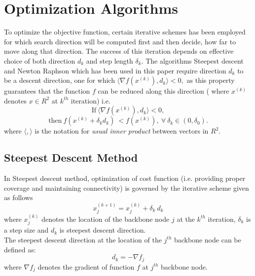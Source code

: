\documentclass[11pt]{article}
\numberwithin{equation}{section}
\begin{document}
\section{Optimization Algorithms}




To optimize the objective function, certain iterative schemes has been employed for which search direction will be computed first and then decide, how far to move along that direction. The success of this iteration depends on effective choice of both direction $d_k$ and step length $\delta_k.$
 The algorithms Steepest descent and Newton Raphson which has been used in this paper require direction $d_k$ to be a descent direction, one for which $\langle \nabla f(x^{(k)}),d_k \rangle <0,$ as this property guarantees that the function $f$ can be reduced along this direction ( where ${x^{(k)}}$ denotes $x \in {R^{2}}$ at $k^{th}$ iteration) i.e.
 \begin{equation*}
  \text{If}~ \langle \nabla f(x^{(k)}),d_k \rangle <0,
 \end{equation*}
 \begin{equation*}
  \text{then}~ f(x^{(k)}+\delta_k d_k)~< f(x^{(k)}),~ \forall~ \delta_k \in(0, \delta_0).
 \end{equation*}
 where $\langle , \rangle $ is the notation for {\it usual inner product} between vectors in $R^2.$





\subsection{Steepest Descent Method}
In Steepest descent method, optimization of cost function (i.e. providing proper coverage and maintaining connectivity) is governed by the iterative scheme given as follows
\begin{equation}\label{e28}
 x_{j}^{(k+1)}=x_{j}^{(k)}+\delta_k~d_{k}
\end{equation}
where $x_{j}^{(k)}$   denotes the location of the backbone node $j$ at the $k^{th}$ iteration,  $\delta_k$ is a step size and $d_{k}$  is steepest descent direction.\\

The steepest descent direction at the location of the $j^{th}$ backbone node can be defined as:
\begin{equation}\label{e27}
d_{k}=-\nabla f_{j}\end{equation}
where
$\nabla f_{j}$ denotes the gradient of function  $f$ at $j^{th} $ backbone node.
\end{document}
